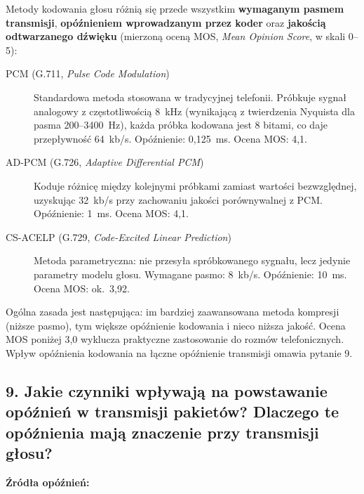\documentclass[12pt,a4paper]{article}
\begin{document}
Metody kodowania głosu różnią się przede wszystkim \textbf{wymaganym pasmem
transmisji}, \textbf{opóźnieniem wprowadzanym przez koder} oraz
\textbf{jakością odtwarzanego dźwięku} (mierzoną oceną MOS,
\emph{Mean Opinion Score}, w skali 0--5):

\begin{description}
  \item[PCM (G.711, \emph{Pulse Code Modulation})]
        Standardowa metoda stosowana w tradycyjnej telefonii. Próbkuje sygnał
        analogowy z częstotliwością 8~kHz (wynikającą z twierdzenia Nyquista
        dla pasma 200--3400~Hz), każda próbka kodowana jest 8 bitami, co daje
        przepływność 64~kb/s. Opóźnienie: 0,125~ms. Ocena MOS: 4,1.
  \item[AD-PCM (G.726, \emph{Adaptive Differential PCM})]
        Koduje różnicę między kolejnymi próbkami zamiast wartości bezwzględnej,
        uzyskując 32~kb/s przy zachowaniu jakości porównywalnej z PCM.
        Opóźnienie: 1~ms. Ocena MOS: 4,1.
  \item[CS-ACELP (G.729, \emph{Code-Excited Linear Prediction})]
        Metoda parametryczna: nie przesyła spróbkowanego sygnału, lecz jedynie
        parametry modelu głosu. Wymagane pasmo: 8~kb/s. Opóźnienie: 10~ms.
        Ocena MOS: ok.\ 3,92.
\end{description}

Ogólna zasada jest następująca: im bardziej zaawansowana metoda kompresji
(niższe pasmo), tym większe opóźnienie kodowania i nieco niższa jakość. Ocena
MOS poniżej 3,0 wyklucza praktyczne zastosowanie do rozmów telefonicznych.
Wpływ opóźnienia kodowania na łączne opóźnienie transmisji omawia pytanie 9.

\subsection*{9. Jakie czynniki wpływają na powstawanie opóźnień w transmisji
pakietów? Dlaczego te opóźnienia mają znaczenie przy transmisji głosu?}

\textbf{Źródła opóźnień:}
\end{document}
